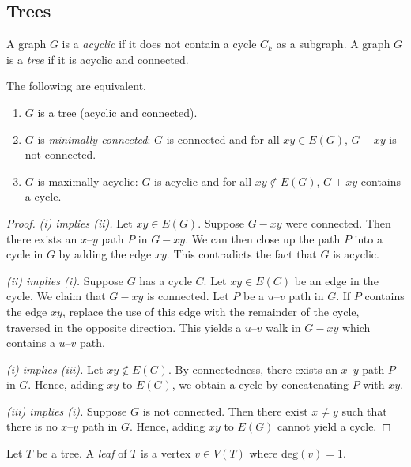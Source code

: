 \subsection{Trees}
\begin{definition}
	A graph \( G \) is a \emph{acyclic} if it does not contain a cycle \( C_k \) as a subgraph.
	A graph \( G \) is a \emph{tree} if it is acyclic and connected.
\end{definition}
\begin{proposition}
	The following are equivalent.
	\begin{enumerate}
		\item \( G \) is a tree (acyclic and connected).
		\item \( G \) is \emph{minimally connected}: \( G \) is connected and for all \( xy \in E(G) \), \( G - xy \) is not connected.
		\item \( G \) is maximally acyclic: \( G \) is acyclic and for all \( xy \not\in E(G) \), \( G + xy \) contains a cycle.
	\end{enumerate}
\end{proposition}
\begin{proof}
	\emph{(i) implies (ii).}
	Let \( xy \in E(G) \).
	Suppose \( G - xy \) were connected.
	Then there exists an \( x \)--\( y \) path \( P \) in \( G - xy \).
	We can then close up the path \( P \) into a cycle in \( G \) by adding the edge \( xy \).
	This contradicts the fact that \( G \) is acyclic.

	\emph{(ii) implies (i).}
	Suppose \( G \) has a cycle \( C \).
	Let \( xy \in E(C) \) be an edge in the cycle.
	We claim that \( G - xy \) is connected.
	Let \( P \) be a \( u \)--\( v \) path in \( G \).
	If \( P \) contains the edge \( xy \), replace the use of this edge with the remainder of the cycle, traversed in the opposite direction.
	This yields a \( u \)--\( v \) walk in \( G - xy \) which contains a \( u \)--\( v \) path.

	\emph{(i) implies (iii).}
	Let \( xy \not\in E(G) \).
	By connectedness, there exists an \( x \)--\( y \) path \( P \) in \( G \).
	Hence, adding \( xy \) to \( E(G) \), we obtain a cycle by concatenating \( P \) with \( xy \).

	\emph{(iii) implies (i).}
	Suppose \( G \) is not connected.
	Then there exist \( x \neq y \) such that there is no \( x \)--\( y \) path in \( G \).
	Hence, adding \( xy \) to \( E(G) \) cannot yield a cycle.
\end{proof}
\begin{definition}
	Let \( T \) be a tree.
	A \emph{leaf} of \( T \) is a vertex \( v \in V(T) \) where \( \mathrm{deg}(v) = 1 \).
\end{definition}

